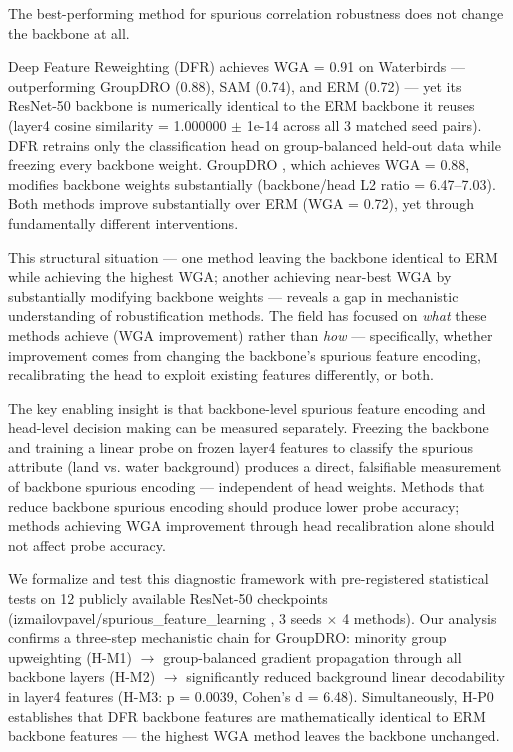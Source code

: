 
The best-performing method for spurious correlation robustness does not change the backbone at all.

Deep Feature Reweighting (DFR) \citep{kirichenko2022last} achieves WGA = 0.91 on Waterbirds --- outperforming GroupDRO (0.88), SAM (0.74), and ERM (0.72) --- yet its ResNet-50 backbone is numerically identical to the ERM backbone it reuses (layer4 cosine similarity = 1.000000 $\pm$ 1e-14 across all 3 matched seed pairs). DFR retrains only the classification head on group-balanced held-out data while freezing every backbone weight. GroupDRO \citep{sagawa2019distributionally}, which achieves WGA = 0.88, modifies backbone weights substantially (backbone/head L2 ratio = 6.47--7.03). Both methods improve substantially over ERM (WGA = 0.72), yet through fundamentally different interventions.

This structural situation --- one method leaving the backbone identical to ERM while achieving the highest WGA; another achieving near-best WGA by substantially modifying backbone weights --- reveals a gap in mechanistic understanding of robustification methods. The field has focused on \textit{what} these methods achieve (WGA improvement) rather than \textit{how} --- specifically, whether improvement comes from changing the backbone's spurious feature encoding, recalibrating the head to exploit existing features differently, or both.

The key enabling insight is that backbone-level spurious feature encoding and head-level decision making can be measured separately. Freezing the backbone and training a linear probe on frozen layer4 features to classify the spurious attribute (land vs. water background) produces a direct, falsifiable measurement of backbone spurious encoding --- independent of head weights. Methods that reduce backbone spurious encoding should produce lower probe accuracy; methods achieving WGA improvement through head recalibration alone should not affect probe accuracy.

We formalize and test this diagnostic framework with pre-registered statistical tests on 12 publicly available ResNet-50 checkpoints (izmailovpavel/spurious\_feature\_learning \citep{izmailov2022feature}, 3 seeds $\times$ 4 methods). Our analysis confirms a three-step mechanistic chain for GroupDRO: minority group upweighting (H-M1) $\rightarrow$ group-balanced gradient propagation through all backbone layers (H-M2) $\rightarrow$ significantly reduced background linear decodability in layer4 features (H-M3: p = 0.0039, Cohen's d = 6.48). Simultaneously, H-P0 establishes that DFR backbone features are mathematically identical to ERM backbone features --- the highest WGA method leaves the backbone unchanged.

